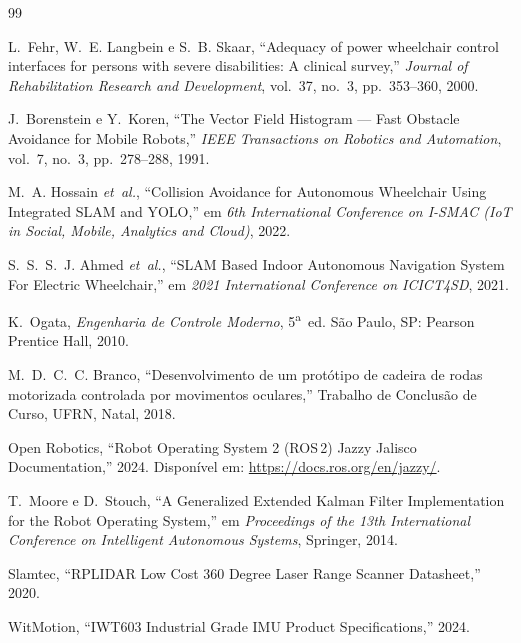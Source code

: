 \documentclass[conference]{IEEEtran}
\begin{document}
\begin{thebibliography}{99}

L.~Fehr, W.~E. Langbein e S.~B. Skaar, ``Adequacy of power wheelchair
control interfaces for persons with severe disabilities: A clinical
survey,'' \emph{Journal of Rehabilitation Research and Development},
vol.~37, no.~3, pp.~353--360, 2000.

J.~Borenstein e Y.~Koren, ``The Vector Field Histogram --- Fast Obstacle
Avoidance for Mobile Robots,'' \emph{IEEE Transactions on Robotics and
Automation}, vol.~7, no.~3, pp.~278--288, 1991.

M.~A. Hossain \emph{et~al.}, ``Collision Avoidance for Autonomous
Wheelchair Using Integrated SLAM and YOLO,'' em \emph{6th International
Conference on I-SMAC (IoT in Social, Mobile, Analytics and Cloud)}, 2022.

S.~S.~S.~J. Ahmed \emph{et~al.}, ``SLAM Based Indoor Autonomous
Navigation System For Electric Wheelchair,'' em \emph{2021 International
Conference on ICICT4SD}, 2021.

K.~Ogata, \emph{Engenharia de Controle Moderno}, 5\textsuperscript{a}~ed.
São Paulo, SP: Pearson Prentice Hall, 2010.

M.~D.~C.~C. Branco, ``Desenvolvimento de um protótipo de cadeira de rodas
motorizada controlada por movimentos oculares,'' Trabalho de Conclusão
de Curso, UFRN, Natal, 2018.

Open Robotics, ``Robot Operating System 2 (ROS\,2) Jazzy Jalisco
Documentation,'' 2024. Disponível em:
\url{https://docs.ros.org/en/jazzy/}.

T.~Moore e D.~Stouch, ``A Generalized Extended Kalman Filter
Implementation for the Robot Operating System,'' em \emph{Proceedings of
the 13th International Conference on Intelligent Autonomous Systems},
Springer, 2014.

Slamtec, ``RPLIDAR Low Cost 360 Degree Laser Range Scanner Datasheet,''
2020.

WitMotion, ``IWT603 Industrial Grade IMU Product Specifications,'' 2024.

\end{thebibliography}
\end{document}
